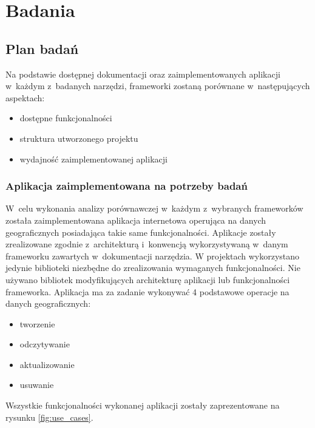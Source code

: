 \documentclass[printmode]{mgr}
\begin{document}
\chapter{Badania}

\section{Plan badań}

Na podstawie dostępnej dokumentacji oraz zaimplementowanych aplikacji w~każdym z~badanych narzędzi, frameworki zostaną porównane w~następujących aspektach:
\begin{itemize}
  \item dostępne funkcjonalności
  \item struktura utworzonego projektu
  \item wydajność zaimplementowanej aplikacji
\end{itemize}


\subsection{Aplikacja zaimplementowana na potrzeby badań}

W~celu wykonania analizy porównawczej w~każdym z~wybranych frameworków została zaimplementowana aplikacja internetowa operująca na danych geograficznych posiadająca takie same funkcjonalności. Aplikacje zostały zrealizowane zgodnie z~architekturą i~konwencją wykorzystywaną w~danym frameworku zawartych w~dokumentacji narzędzia. W projektach wykorzystano jedynie biblioteki niezbędne do zrealizowania wymaganych funkcjonalności. Nie używano bibliotek modyfikujących architekturę aplikacji lub funkcjonalności frameworka.
Aplikacja ma za zadanie wykonywać 4 podstawowe operacje na danych geograficznych:
\begin{itemize}
  \item tworzenie
  \item odczytywanie
  \item aktualizowanie
  \item usuwanie
\end{itemize}

Wszystkie funkcjonalności wykonanej aplikacji zostały zaprezentowane na rysunku \ref{fig:use_cases}.
\end{document}
